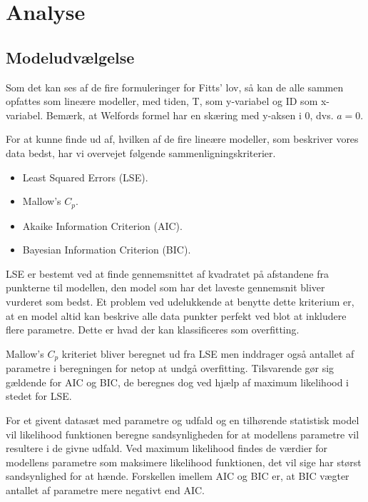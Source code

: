 
\newpage
{}
\chapter*{Analyse}
\section*{Modeludvælgelse}
Som det kan ses af de fire formuleringer for Fitts' lov, så kan de alle sammen opfattes som lineære modeller, med tiden, T, som y-variabel og ID som x-variabel. Bemærk, at Welfords formel har en skæring med y-aksen i 0, dvs. $a=0$. 

For at kunne finde ud af, hvilken af de fire lineære modeller, som beskriver vores data bedst, har vi overvejet følgende sammenligningskriterier.

\begin{itemize}
\item{Least Squared Errors (LSE).}
\item{Mallow's $C_p$.}
\item{Akaike Information Criterion (AIC).}
\item{Bayesian Information Criterion (BIC).}
\end{itemize}

LSE er bestemt ved at finde gennemsnittet af kvadratet på afstandene fra punkterne til modellen, den model som har det laveste gennemsnit bliver vurderet som bedst. Et problem ved udelukkende at benytte dette kriterium er, at en model altid kan beskrive alle data punkter perfekt ved blot at inkludere flere parametre. Dette er hvad der kan klassificeres som overfitting.

Mallow's $C_p$ kriteriet bliver beregnet ud fra LSE men inddrager også antallet af parametre i beregningen for netop at undgå overfitting. Tilsvarende gør sig gældende for AIC og BIC, de beregnes dog ved hjælp af maximum likelihood i stedet for LSE.

For et givent datasæt med parametre og udfald og en tilhørende statistisk model vil likelihood funktionen beregne sandsynligheden for at modellens parametre vil resultere i de givne udfald. Ved maximum likelihood findes de værdier for modellens parametre som maksimere likelihood funktionen, det vil sige har størst sandsynlighed for at hænde. Forskellen imellem AIC og BIC er, at BIC vægter antallet af parametre mere negativt end AIC.


